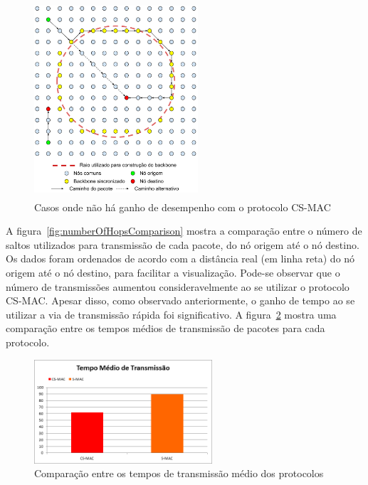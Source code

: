 \begin{figure}[!htb]
\centering
\includegraphics[width=230px,height=275px]{./Pictures/BackboneExceptions.png}
\caption{Casos onde não há ganho de desempenho com o protocolo CS-MAC} %
\label{fig:backboneExceptions} %
\end{figure}

A figura~\ref{fig:numberOfHopsComparison} mostra a comparação entre o número de saltos utilizados para transmissão de cada pacote, do nó origem até o nó destino. Os dados foram ordenados de acordo com a distância real (em linha reta) do nó origem até o nó destino, para facilitar a visualização. Pode-se observar que o número de transmissões aumentou consideravelmente ao se utilizar o protocolo CS-MAC. Apesar disso, como observado anteriormente, o ganho de tempo ao se utilizar a via de transmissão rápida foi significativo. A figura~\ref{fig:averageTransmissionTime} mostra uma comparação entre os tempos médios de transmissão de pacotes para cada protocolo.


\begin{figure}[!htb]
\centering
\includegraphics[width=250px,height=146px]{./Pictures/AverageTransmissionTime.png}
\caption{Comparação entre os tempos de transmissão médio dos protocolos} %
\label{fig:averageTransmissionTime} %
\end{figure}

